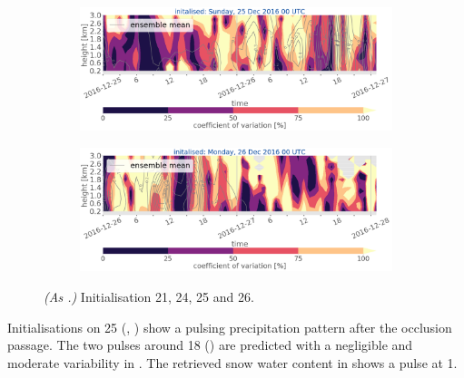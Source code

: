 \begin{figure}[H]%
	\begin{subfigure}[b]{\textwidth}
		\includegraphics[trim={0cm 5cm 0cm 0cm},clip,width=\textwidth]{./fig_variation/20161225}
		\caption{}\label{fig:vari:EM25}
	\end{subfigure}
	\begin{subfigure}[b]{\textwidth}
		\includegraphics[trim={0cm 0cm 0cm 0cm},clip,width=\textwidth]{./fig_variation/20161226}
		\caption{}\label{fig:vari:EM26}
	\end{subfigure}
	\caption{\textit{(As .)} Initialisation \num{21}, \num{24}, \num{25} and \SI{26}{\dec}.}\label{fig:ens_vari:2526}
\end{figure}
\noindent 
Initialisations on \SI{25}{\dec} (, ) show a pulsing precipitation pattern after the occlusion passage. The two pulses around \SI{18}{\UTC} () are predicted with a negligible and moderate variability in . %
The retrieved snow water content in  shows a pulse at \SI{1}{\UTC}.
